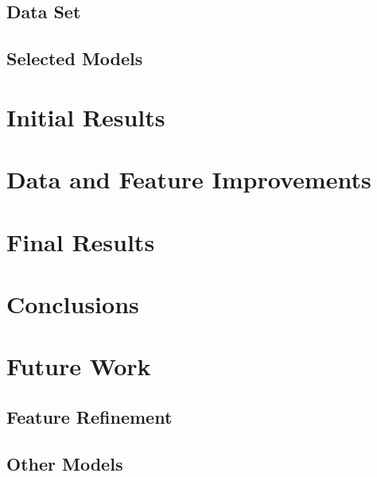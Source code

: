 \documentclass{article}
\begin{document}
\subsection{Data Set}

\subsection{Selected Models}

\pagebreak

\section{Initial Results}

\section{Data and Feature Improvements}

\section{Final Results}

\pagebreak

\section{Conclusions}

\section{Future Work}

\subsection{Feature Refinement}

\subsection{Other Models}




\end{document}
